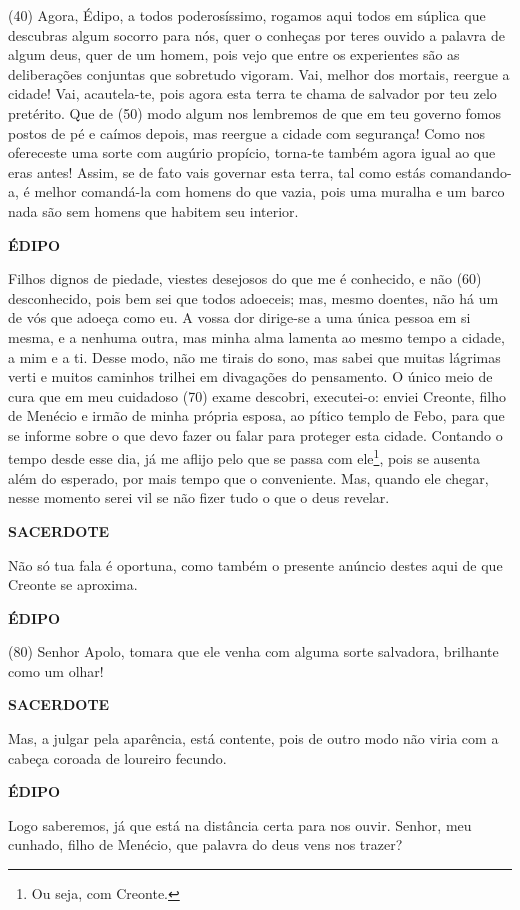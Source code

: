 (40) Agora, Édipo, a todos poderosíssimo, rogamos aqui todos em súplica
que descubras algum socorro para nós, quer o conheças por teres ouvido a
palavra de algum deus, quer de um homem, pois vejo que entre os
experientes são as deliberações conjuntas que sobretudo vigoram. Vai,
melhor dos mortais, reergue a cidade! Vai, acautela-te, pois agora esta
terra te chama de salvador por teu zelo pretérito. Que de (50) modo
algum nos lembremos de que em teu governo fomos postos de pé e caímos
depois, mas reergue a cidade com segurança! Como nos ofereceste uma
sorte com augúrio propício, torna-te também agora igual ao que eras
antes! Assim, se de fato vais governar esta terra, tal como estás
comandando-a, é melhor comandá-la com homens do que vazia, pois uma
muralha e um barco nada são sem homens que habitem seu interior.

\textbf{ÉDIPO}

Filhos dignos de piedade, viestes desejosos do que me é conhecido, e não
(60) desconhecido, pois bem sei que todos adoeceis; mas, mesmo doentes,
não há um de vós que adoeça como eu. A vossa dor dirige-se a uma única
pessoa em si mesma, e a nenhuma outra, mas minha alma lamenta ao mesmo
tempo a cidade, a mim e a ti. Desse modo, não me tirais do sono, mas
sabei que muitas lágrimas verti e muitos caminhos trilhei em divagações
do pensamento. O único meio de cura que em meu cuidadoso (70) exame
descobri, executei-o: enviei Creonte, filho de Menécio e irmão de minha
própria esposa, ao pítico templo de Febo, para que se informe sobre o
que devo fazer ou falar para proteger esta cidade. Contando o tempo
desde esse dia, já me aflijo pelo que se passa com ele\footnote{Ou seja,
  com Creonte.}, pois se ausenta além do esperado, por mais tempo que o
conveniente. Mas, quando ele chegar, nesse momento serei vil se não
fizer tudo o que o deus revelar.

\textbf{SACERDOTE}

Não só tua fala é oportuna, como também o presente anúncio destes aqui
de que Creonte se aproxima.

\textbf{ÉDIPO}

(80) Senhor Apolo, tomara que ele venha com alguma sorte salvadora,
brilhante como um olhar!

\textbf{SACERDOTE}

Mas, a julgar pela aparência, está contente, pois de outro modo não
viria com a cabeça coroada de loureiro fecundo.

\textbf{ÉDIPO}

Logo saberemos, já que está na distância certa para nos ouvir. Senhor,
meu cunhado, filho de Menécio, que palavra do deus vens nos trazer?

